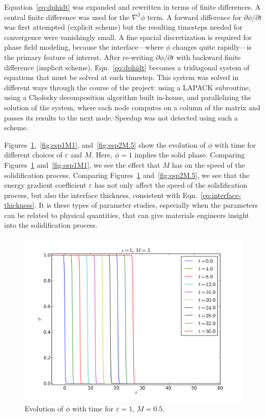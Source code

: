 \documentclass[12pt]{article}
\newcommand\lap[1]{\nabla^2 #1}
\let\epsilon\varepsilon
\begin{document}
Equation~\eqref{eq:dphidt} was expanded and rewritten in terms of
finite differences. A central finite difference was used for the $\lap
\phi$ term. A forward difference for $\partial \phi / \partial t$ was
first attempted (explicit scheme) but the resulting timesteps needed
for convergence were vanishingly small. A fine spacial discretization
is required for phase field modeling, because the interface---where
$\phi$ changes quite rapidly---is the primary feature of interest.
After re-writing $\partial \phi / \partial t$ with backward finite
difference (implicit scheme), Eqn.~\eqref{eq:dphidt} becomes a
tridiagonal system of equations that must be solved at each timestep.
This system was solved in different ways through the course of the
project: using a LAPACK subroutine, using a Cholesky decomposition
algorithm built in-house, and parallelizing the solution of the
system, where each node computes on a column of the matrix and passes
its results to the next node. Speedup was not detected using such a
scheme.

Figures~\ref{fig:esp1M.5},~\ref{fig:esp1M1}, and~\ref{fig:esp2M.5}
show the evolution of $\phi$ with time for different choices of
$\epsilon$ and $M$. Here, $\phi=1$ implies the solid phase. Comparing
Figures~\ref{fig:esp1M.5} and~\ref{fig:esp1M1}, we see the effect that
$M$ has on the speed of the solidification process. Comparing
Figures~\ref{fig:esp1M.5} and~\ref{fig:esp2M.5}, we see that the
energy gradient coefficient $\epsilon$ has not only affect the speed
of the solidification process, but also the interface thickness,
consistent with Eqn.~\eqref{eq:interface-thickness}. It is these types
of parameter studies, especially when the parameters can be related to
physical quantities, that can give materials engineers insight into
the solidification process.

\begin{figure}[htbp]
  \centering
  \begin{minipage}[t]{.8\linewidth}
    \centering
    \includegraphics[width=\linewidth]{img/1D_eps1_M05}
    \caption{Evolution of $\phi$ with time for $\epsilon= 1$, $M =
    0.5$.}
    \label{fig:esp1M.5}
  \end{minipage}
\end{figure}
\end{document}

